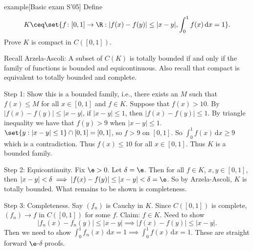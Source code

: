 \documentclass[class=article, crop=false]{standalone}
\begin{document}
\begin{understandingcheck}{example}[Basic exam S'05]
  Define
    \[
      K \ceq \set{f\colon [0,1] \to \R: |f(x)-f(y)| \leq |x-y|, \int_{0}^{1} f(x) \, \mathrm{d}x  = 1}.
    \]
  Prove $K$ is compact in $C([0,1])$.

  \begin{pf}
    Recall Arzela-Ascoli: A subset of $C(K)$ is totally bounded if and only if the family of functions is bounded and equicontinuous. Also recall that compact is equivalent to totally bounded and complete.

    Step 1: Show this is a bounded family, i.e., there exists an $M$ such that $f(x) \leq M$ for all $x \in [0,1]$ and $f \in K$. Suppose that $f(x) > 10$. By $|f(x)-f(y)| \leq |x-y|$, if $|x-y| \leq 1$, then $|f(x)-f(y)| \leq 1$. By triangle inequality we have that $f(y) > 9$ when $|x-y| \leq 1$. $\set{y : |x-y| \leq 1} \cap [0,1] = [0,1]$, so $f > 9$ on $[0,1]$. So $\int_{0}^{1} f(x) \, \mathrm{d}x \geq 9$ which is a contradiction. Thus $f(x) \leq 10$ for all $x \in [0,1]$. Thus $K$ is a bounded family.

    Step 2: Equicontinuity. Fix $\e > 0$. Let $\delta = \e$. Then for all $f \in K$, $x,y \in [0,1]$, then $|x-y| < \delta \implies |f(x)-f(y)| \leq |x-y| < \delta = \e$. So by Arzela-Ascoli, $K$ is totally bounded. What remains to be shown is completeness.

    Step 3: Completeness. Say $(f_n)$ is Cauchy in $K$. Since $C([0,1])$ is complete, $(f_n) \to f$ in $C([0,1])$ for some $f$. Claim: $f \in K$. Need to show
      \[
        |f_n(x)- f_n(y) | \leq |x-y| \implies |f(x)-f(y)| \leq |x-y|.
      \]
    Then we need to show $\int_{0}^{1} f_n(x) \, \mathrm{d}x = 1 \implies \int_{0}^{1} f(x) \, \mathrm{d}x =1$. These are straight forward $\e$-$\delta$ proofs.
  \end{pf}
\end{understandingcheck}
\end{document}
